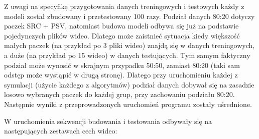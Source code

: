 Z uwagi na specyfikę przygotowania danych treningowych i testowych każdy z modeli został zbudowany i przetestowany 100 razy. Podział danych 80:20 dotyczy paczek SRC + PSV, natomiast budowa modeli odbywa się już na podstawie pojedynczych plików wideo. Dlatego może zaistnieć sytuacja kiedy większość małych paczek (na przykład po 3 pliki wideo) znajdą się w danych treningowych, a duże (na przykład po 15 wideo) w danych testujących. Tym samym faktyczny podział może wynosić w skrajnym przypadku 50:50, zamiast 80:20 (taki sam odstęp może wystąpić w drugą stronę). Dlatego przy uruchomieniu każdej z symulacji (użycie każdego z algorytmów) podział danych dobywał się na zasadzie losowo wybranych paczek do każdej grup, przy zachowaniu podziału 80:20. Następnie wyniki z przeprowadzonych uruchomień programu zostały uśrednione.\par
W uruchomienia sekwencji budowania i testowania odbywały się na następujących zestawach cech wideo:
